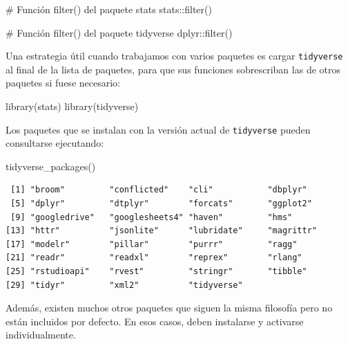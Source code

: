 \documentclass[
  spanish,
  letterpaper,
  DIV=11,
  numbers=noendperiod]{scrreprt}
\newenvironment{Shaded}{\begin{snugshade}}{\end{snugshade}}
\newcommand{\CommentTok}[1]{\textcolor[rgb]{0.37,0.37,0.37}{#1}}
\newcommand{\FunctionTok}[1]{\textcolor[rgb]{0.28,0.35,0.67}{#1}}
\newcommand{\NormalTok}[1]{\textcolor[rgb]{0.00,0.23,0.31}{#1}}
\newcommand{\SpecialCharTok}[1]{\textcolor[rgb]{0.37,0.37,0.37}{#1}}
\begin{document}
\begin{Shaded}
\begin{Highlighting}[]
\CommentTok{\# Función filter() del paquete stats}
\NormalTok{stats}\SpecialCharTok{::}\FunctionTok{filter}\NormalTok{()}

\CommentTok{\# Función filter() del paquete tidyverse}
\NormalTok{dplyr}\SpecialCharTok{::}\FunctionTok{filter}\NormalTok{()}
\end{Highlighting}
\end{Shaded}

Una estrategia útil cuando trabajamos con varios paquetes es cargar
\texttt{tidyverse} al final de la lista de paquetes, para que sus
funciones sobrescriban las de otros paquetes si fuese necesario:

\begin{Shaded}
\begin{Highlighting}[]
\FunctionTok{library}\NormalTok{(stats)}
\FunctionTok{library}\NormalTok{(tidyverse)}
\end{Highlighting}
\end{Shaded}

Los paquetes que se instalan con la versión actual de \texttt{tidyverse}
pueden consultarse ejecutando:

\begin{Shaded}
\begin{Highlighting}[]
\FunctionTok{tidyverse\_packages}\NormalTok{()}
\end{Highlighting}
\end{Shaded}

\begin{verbatim}
 [1] "broom"         "conflicted"    "cli"           "dbplyr"       
 [5] "dplyr"         "dtplyr"        "forcats"       "ggplot2"      
 [9] "googledrive"   "googlesheets4" "haven"         "hms"          
[13] "httr"          "jsonlite"      "lubridate"     "magrittr"     
[17] "modelr"        "pillar"        "purrr"         "ragg"         
[21] "readr"         "readxl"        "reprex"        "rlang"        
[25] "rstudioapi"    "rvest"         "stringr"       "tibble"       
[29] "tidyr"         "xml2"          "tidyverse"    
\end{verbatim}

Además, existen muchos otros paquetes que siguen la misma filosofía pero
no están incluidos por defecto. En esos casos, deben instalarse y
activarse individualmente.
\end{document}
